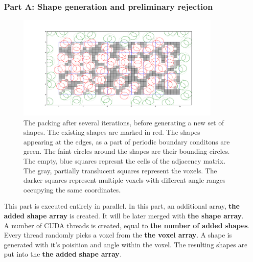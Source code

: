\documentclass[12pt, oneside]{report}
\begin{document}
\subsubsection{Part A: Shape generation and preliminary rejection}

\begin{figure}[H]
  \centering
	\includegraphics[width=0.9\textwidth,keepaspectratio]{Images/GPURSA/Figure_1.pdf}
	\caption{The packing after several iterations, before generating a new set of shapes.\newline
	The existing shapes are marked in red. The shapes appearing at the edges, as a part of periodic boundary conditons are green. The faint circles around the shapes are their bounding circles. The empty, blue squares represnt the cells of the adjacency matrix. The gray, partially translucent squares represent the voxels. The darker squares represent multiple voxels with different angle ranges occupying the same coordinates.}
	\label{GPURSA_Process_1}
\end{figure}

\newpage

This part is executed entirely in parallel. \newline
In this part, an additional array, \textbf{the added shape array} is created. It will be later merged with \textbf{the shape array}. \newline
A number of CUDA threads is created, equal to \textbf{the number of added shapes}. Every thread randomly picks a voxel from the \textbf{the voxel array}. A shape is generated with it's poisition and angle within the voxel. The resulting shapes are put into the \textbf{the added shape array}.
\end{document}
